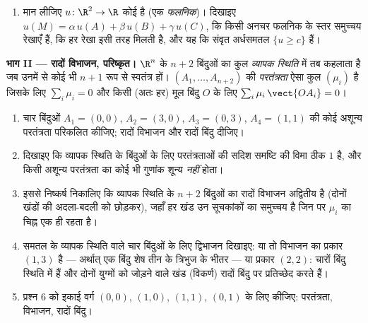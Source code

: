 \begin{problem}
\begin{enumerate}
        कि तीनों रेखाएँ समतल को ठीक सात क्षेत्रों में काटती हैं, जिनका
        वर्गीकरण $(\alpha, \beta, \gamma)$ के चिह्नों से होता है (और चिह्न-प्रतिरूप $(-, -,
        -)$ असंभव
        है)।
  \item मान लीजिए $u \colon \R^2 \to \R$ कोई  है (एक \emph{ फलनिक})।
        दिखाइए $u(M) = \alpha\,u(A) +
        \beta\,u(B) + \gamma\,u(C)$, कि किसी अनचर  फलनिक के स्तर समुच्चय रेखाएँ हैं,
        कि हर रेखा इसी तरह मिलती है, और यह कि संवृत अर्धसमतल $\{u
        \geq c\}$ 
        हैं।
\end{enumerate}

\medskip
\noindent\textbf{भाग II --- रादों विभाजन, परिष्कृत।} $\R^n$ के $n + 2$ बिंदुओं
का कुल \emph{व्यापक स्थिति} में तब कहलाता है जब उनमें से कोई भी $n + 1$ 
रूप से स्वतंत्र हों। $(A_1, \dots, A_{n+2})$ की \emph{ परतंत्रता} ऐसा कुल $(\mu_i)$ है जिसके लिए
$\sum_i \mu_i = 0$ और किसी (अतः हर) मूल बिंदु $O$ के लिए $\sum_i
\mu_i\,\vect{OA_i} = 0$।
\begin{enumerate}[resume]
  \item चार बिंदुओं $A_1 = (0,0)$, $A_2 = (3,0)$, $A_3 = (0,3)$, $A_4 = (1,1)$ की कोई अशून्य  परतंत्रता परिकलित
        कीजिए; रादों विभाजन और रादों बिंदु दीजिए।
  \item दिखाइए कि व्यापक स्थिति के बिंदुओं के लिए  परतंत्रताओं की सदिश
        समष्टि की विमा ठीक $1$ है, और किसी अशून्य परतंत्रता का कोई भी
        गुणांक शून्य \emph{नहीं} होता।
  \item इससे निष्कर्ष निकालिए कि व्यापक स्थिति के $n + 2$ बिंदुओं का रादों
        विभाजन अद्वितीय है (दोनों खंडों की अदला-बदली को छोड़कर), जहाँ हर
        खंड उन सूचकांकों का समुच्चय है जिन पर $\mu_i$ का चिह्न एक ही रहता है।
  \item समतल के व्यापक स्थिति वाले चार बिंदुओं के लिए द्विभाजन दिखाइए: या
        तो विभाजन का प्रकार $(1, 3)$ है --- अर्थात् एक बिंदु शेष तीन के
        त्रिभुज के भीतर --- या प्रकार $(2, 2)$: चारों बिंदु  स्थिति में
        हैं और दोनों युग्मों को जोड़ने वाले खंड (विकर्ण) रादों बिंदु पर
        प्रतिच्छेद करते हैं।
  \item प्रश्न 6 को इकाई वर्ग $(0,0)$, $(1,0)$, $(1,1)$, $(0,1)$ के लिए कीजिए:
        परतंत्रता, विभाजन, रादों बिंदु।
\end{enumerate}


\end{problem}
